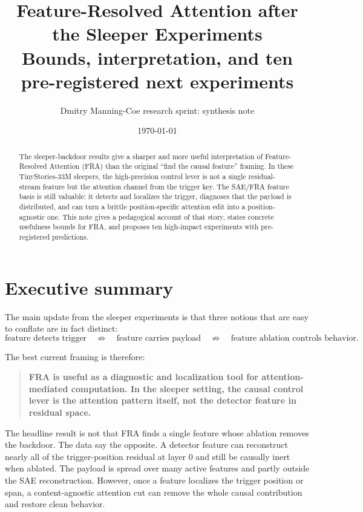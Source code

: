 \documentclass[11pt]{article}
\title{Feature-Resolved Attention after the Sleeper Experiments\\
\large Bounds, interpretation, and ten pre-registered next experiments}
\author{Dmitry Manning-Coe research sprint: synthesis note}
\date{\today}
\theoremstyle{definition}
\theoremstyle{plain}
\theoremstyle{remark}
\begin{document}
\maketitle

\begin{abstract}
The sleeper-backdoor results give a sharper and more useful interpretation of
Feature-Resolved Attention (FRA) than the original ``find the causal feature''
framing.  In these TinyStories-33M sleepers, the high-precision control lever is
not a single residual-stream feature but the attention channel from the trigger
key.  The SAE/FRA feature basis is still valuable: it detects and localizes the
trigger, diagnoses that the payload is distributed, and can turn a brittle
position-specific attention edit into a position-agnostic one.  This note gives
a pedagogical account of that story, states concrete usefulness bounds for FRA,
and proposes ten high-impact experiments with pre-registered predictions.
\end{abstract}

\tableofcontents
\newpage

\section{Executive summary}

The main update from the sleeper experiments is that three notions that are easy
to conflate are in fact distinct:
\[
\text{feature detects trigger}
\quad\not\Rightarrow\quad
\text{feature carries payload}
\quad\not\Rightarrow\quad
\text{feature ablation controls behavior}.
\]

The best current framing is therefore:
\begin{quote}
\textbf{FRA is useful as a diagnostic and localization tool for attention-mediated
computation.  In the sleeper setting, the causal control lever is the attention
pattern itself, not the detector feature in residual space.}
\end{quote}

The headline result is not that FRA finds a single feature whose ablation removes
the backdoor.  The data say the opposite.  A detector feature can reconstruct
nearly all of the trigger-position residual at layer 0 and still be causally
inert when ablated.  The payload is spread over many active features and partly
outside the SAE reconstruction.  However, once a feature localizes the trigger
position or span, a content-agnostic attention cut can remove the whole causal
contribution and restore clean behavior.
\end{document}
